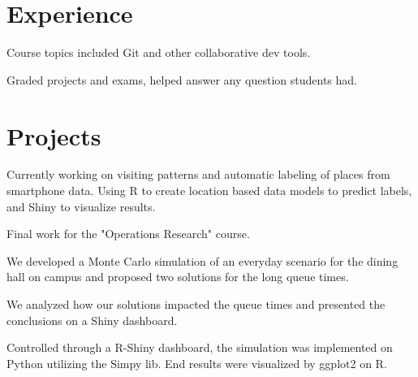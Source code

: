 \documentclass[]{deedy-resume-openfont}
\begin{document}
\begin{minipage}[t]{0.66\textwidth} 


\section{Experience}

\vspace{\topsep}
\begin{tightemize}
\item Course topics included Git and other collaborative dev tools.
\item Graded projects and exams, helped answer any question students had. 
\end{tightemize}
\sectionsep

\section{Projects}

\descript{}
\begin{tightemize}
\item Currently working on visiting patterns and
automatic labeling of places from smartphone data. Using R to create location based data models to predict labels, and Shiny to visualize results.
\end{tightemize}
\sectionsep

\begin{tightemize}
\item Final work for the "Operations Research" course.
\item We developed a Monte Carlo simulation of an everyday scenario for the dining hall on campus and proposed two solutions for the long queue times.
\item We analyzed how our solutions impacted the queue times and presented the conclusions on a Shiny dashboard.
\item Controlled through a R-Shiny dashboard, the simulation was implemented on Python utilizing the Simpy lib. End results were visualized by ggplot2 on R.
\end{tightemize}
\sectionsep


\end{minipage}
\end{document}
